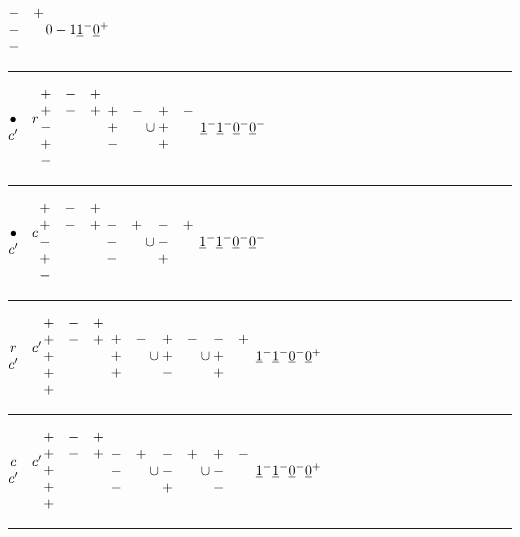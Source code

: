 \documentclass[11pt ,reqno]{amsart}
\begin{document}
\qquad $\begin{matrix} -&+\\-&\\-\end{matrix}$\qquad $0-1{\underline{1}}^-{\underline{0}}^+$\hfill
\medskip
\hrule
\medskip
$\begin{matrix} \bullet&r\\ c'&\end{matrix}$\qquad  $\begin{matrix} +&-&+\\ +&-&+\\-&&\\+&&\\-&&\end{matrix}$
\qquad $\begin{matrix} +&-\\+&\\-\end{matrix}\cup\begin{matrix} +&-\\+&\\+\end{matrix} $
\qquad ${\underline{1}}^-{\underline{1}}^-{\underline{0}}^-{\underline{0}}^-$
\hfill
\medskip
\hrule
\medskip
$\begin{matrix} \bullet&c\\ c'&\end{matrix}$\qquad  $\begin{matrix} +&-&+\\ +&-&+\\-&&\\+&&\\-&&\end{matrix}$
\qquad $\begin{matrix} -&+\\-&\\-\end{matrix}\cup\begin{matrix} -&+\\-&\\+\end{matrix} $
\qquad ${\underline{1}}^-{\underline{1}}^-{\underline{0}}^-{\underline{0}}^-$
\hfill
\medskip
\hrule
\medskip
$\begin{matrix} r&c'\\ c'&\end{matrix}$\qquad  $\begin{matrix} +&-&+\\ +&-&+\\+&&\\+&&\\+&&\end{matrix}$
\qquad $\begin{matrix} +&-\\+&\\+\end{matrix}\cup\begin{matrix} +&-\\+&\\-\end{matrix}\cup \begin{matrix}-&+\\+&\\+&\end{matrix} $
\qquad ${\underline{1}}^-{\underline{1}}^-{\underline{0}}^-{\underline{0}}^+$
\hfill
\medskip
\hfill
\medskip
\hrule
\medskip
$\begin{matrix} c&c'\\ c'&\end{matrix}$\qquad  $\begin{matrix} +&-&+\\ +&-&+\\+&&\\+&&\\+&&\end{matrix}$
\qquad $\begin{matrix} -&+\\-&\\-\end{matrix}\cup\begin{matrix} -&+\\-&\\+\end{matrix}\cup\begin{matrix} +&-\\-&\\-\end{matrix}  $
\qquad ${\underline{1}}^-{\underline{1}}^-{\underline{0}}^-{\underline{0}}^+$
\hfill
\medskip
\hrule
\end{document}

